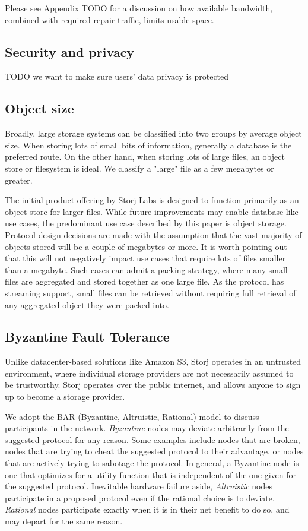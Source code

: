 \documentclass[a4paper,10pt]{article} \usepackage[utf8]{inputenc}
\newcommand{\todo}[1]{{\color{red} TODO #1 }}
\begin{document}
Please see Appendix \todo{} for a discussion on how available bandwidth,
combined with required repair traffic, limits usable space.

\subsection{Security and privacy}

\todo{we want to make sure users' data privacy is protected}

\subsection{Object size}

Broadly, large storage systems can be classified into two groups by average
object size. When storing lots of small bits of information, generally a
database is the preferred route. On the other hand, when storing lots of large
files, an object store or filesystem is ideal. We classify a "large" file as a
few megabytes or greater.

The initial product offering by Storj Labs is designed to function primarily as
an object store for larger files. While future improvements may enable
database-like use cases, the predominant use case described by this paper is
object storage. Protocol design decisions are made with the assumption that the
vast majority of objects stored will be a couple of megabytes or more. It is
worth pointing out that this will not negatively impact use cases that require
lots of files smaller than a megabyte. Such cases can admit a packing
strategy, where many small files are aggregated and stored together as one large
file. As the protocol has streaming support, small files can be retrieved
without requiring full retrieval of any aggregated object they were packed into.

\subsection{Byzantine Fault Tolerance}

Unlike datacenter-based solutions like Amazon S3, Storj operates in an untrusted
environment, where individual storage providers are not necessarily assumed to be
trustworthy. Storj operates over the public internet, and allows anyone to sign
up to become a storage provider.

We adopt the BAR (Byzantine, Altruistic, Rational) model \cite{bar} to discuss
participants in the network.
{\em Byzantine} nodes may deviate arbitrarily from the suggested protocol for
any reason. Some examples include nodes that are broken, nodes that are
trying to cheat the suggested protocol to their advantage, or nodes that
are actively trying to sabotage the protocol. In general, a Byzantine node is
one that optimizes for a utility function that is independent of the one
given for the suggested protocol.
Inevitable hardware failure aside, {\em Altruistic} nodes
participate in a proposed protocol even if the rational choice is to deviate.
{\em Rational} nodes participate exactly when it is in their net benefit to do
so, and may depart for the same reason.
\end{document}

